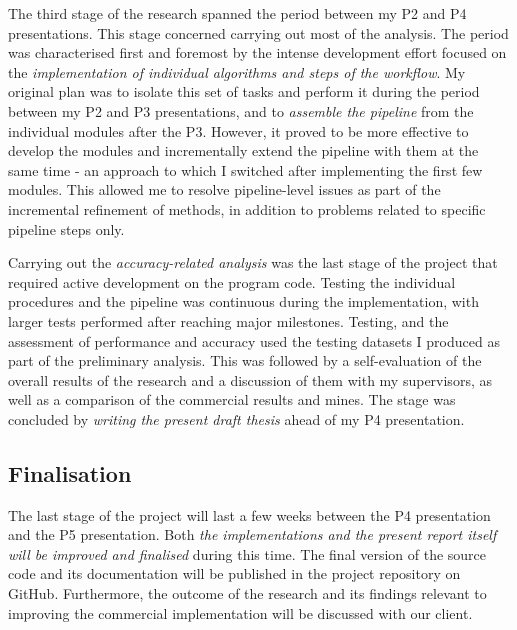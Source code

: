 The third stage of the research spanned the period between my P2 and P4 presentations. This stage concerned carrying out most of the analysis. The period was characterised first and foremost by the intense development effort focused on the \textit{implementation of individual algorithms and steps of the workflow}. My original plan was to isolate this set of tasks and perform it during the period between my P2 and P3 presentations, and to \textit{assemble the pipeline} from the individual modules after the P3. However, it proved to be more effective to develop the modules and incrementally extend the pipeline with them at the same time - an approach to which I switched after implementing the first few modules. This allowed me to resolve pipeline-level issues as part of the incremental refinement of methods, in addition to problems related to specific pipeline steps only.

Carrying out the \textit{accuracy-related analysis} was the last stage of the project that required active development on the program code. Testing the individual procedures and the pipeline was continuous during the implementation, with larger tests performed after reaching major milestones. Testing, and the assessment of performance and accuracy used the testing datasets I produced as part of the preliminary analysis. This was followed by a self-evaluation of the overall results of the research and a discussion of them with my supervisors, as well as a comparison of the commercial results and mines. The stage was concluded by \textit{writing the present draft thesis} ahead of my P4 presentation.

\subsection{Finalisation}
\label{sub:finalisation}

The last stage of the project will last a few weeks between the P4 presentation and the P5 presentation. Both \textit{the implementations and the present report itself will be improved and finalised} during this time. The final version of the source code and its documentation will be published in the project repository on GitHub. Furthermore, the outcome of the research and its findings relevant to improving the commercial implementation will be discussed with our client.

